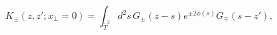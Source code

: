\begin{equation}\label{kxperpzero}
K_\pm(z,z';x_\perp=0)=
\int_{\tilde T^2}d^2 s\,G_\pm(z-s)e^{\pm2\phi(s)}G_\mp(s-z'), 
\end{equation}

